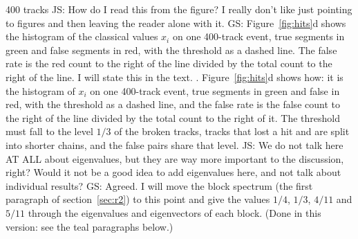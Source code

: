 \documentclass[11pt,a4paper]{article}
\newcommand{\js}[1]{{\color{blue} JS: #1 }}
\newcommand{\gs}[1]{{\color{orange!85!black} GS: #1 }}
\begin{document}
400 tracks \js{How do I read this from the figure? I really don't like just pointing to figures and then leaving the reader alone with it. } \gs{Figure~\ref{fig:hits}d shows the histogram of the classical values $x_i$ on one 400-track event, true segments in green and false segments in red, with the threshold as a dashed line. The false rate is the red count to the right of the line divided by the total count to the right of the line. I will state this in the text.  }. Figure~\ref{fig:hits}d shows how: it is the histogram of $x_i$ on one 400-track event, true
segments in green and false in red, with the threshold as a dashed line, and the false rate is the
false count to the right of the line divided by the total count to the right of it. The threshold
must fall to the level $1/3$ of the broken tracks, tracks that lost a hit and are split into shorter
chains, and the false pairs share that level.
\js{We do not talk here AT ALL about eigenvalues, but they are way more important to the discussion, right? Would it not be a good idea to add eigenvalues here, and not talk about individual results?} \gs{Agreed. I will move the block spectrum (the first paragraph of section~\ref{sec:r2}) to this point and give the values $1/4$, $1/3$, $4/11$ and $5/11$ through the eigenvalues and eigenvectors of each block. (Done in this version: see the teal paragraphs below.)}
\end{document}
